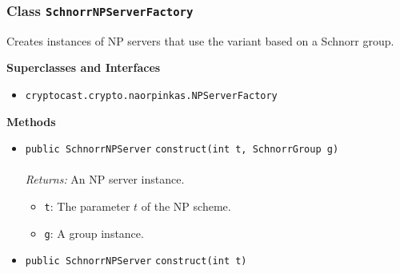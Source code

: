 \subsubsection{Class \lstinline|SchnorrNPServerFactory|}
Creates instances of NP servers that use the variant based on a Schnorr
 group. \\
\noindent\begin{minipage}[t]{5cm}
\vspace{0.3em}
\hspace*{2em}
\vspace{0.3em}
\end{minipage}



\textbf{\sffamily Superclasses and Interfaces}
\begin{itemize}
\item \lstinline|cryptocast.crypto.naorpinkas.NPServerFactory|
\end{itemize}



\textbf{\sffamily Methods}
\begin{itemize}
\item \lstinline|public SchnorrNPServer| \lstinline|construct|\lstinline|(int t, SchnorrGroup g)|\\ \\[-0.6em]
\emph{Returns:} An NP server instance.
\begin{itemize}
\item \lstinline|t|: The parameter $t$ of the NP scheme.
\item \lstinline|g|: A group instance.
\end{itemize}



\item \lstinline|public SchnorrNPServer| \lstinline|construct|\lstinline|(int t)| \\[-0.6em]




\end{itemize}

